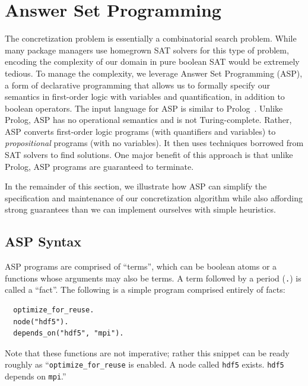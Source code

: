 \section{Answer Set Programming}
\label{sec:asp}

The concretization problem is essentially a combinatorial search problem. While many
package managers use homegrown SAT solvers for this type of problem, encoding the
complexity of our domain in pure boolean SAT would be extremely tedious. To manage the
complexity, we leverage Answer Set Programming (ASP), a form of declarative programming
that allows us to formally specify our semantics in first-order logic with variables and
quantification, in addition to boolean operators. The input language for ASP is similar
to Prolog~\cite{baral_2003}. Unlike Prolog, ASP has no operational semantics and is not
Turing-complete. Rather, ASP converts first-order logic programs (with quantifiers and
variables) to {\it propositional} programs (with no variables). It then uses techniques
borrowed from SAT solvers to find solutions. One major benefit of this approach is that
unlike Prolog, ASP programs are guaranteed to terminate.

In the remainder of this section, we illustrate how ASP can simplify the specification
and maintenance of our concretization algorithm while also affording strong guarantees
than we can implement ourselves with simple heuristics.

\subsection{ASP Syntax}

ASP programs are comprised of ``terms'', which can be boolean atoms or a functions whose
arguments may also be terms. A term followed by a period ({\tt .}) is called a ``fact''.
The following is a simple program comprised entirely of facts:

\begin{verbatim}
  optimize_for_reuse.
  node("hdf5").
  depends_on("hdf5", "mpi").
\end{verbatim}

Note that these functions are not imperative; rather this snippet can be ready roughly
as ``{\tt optimize\_for\_reuse} is enabled. A node called {\tt hdf5} exists. {\tt hdf5} depends on {\tt mpi}.''

